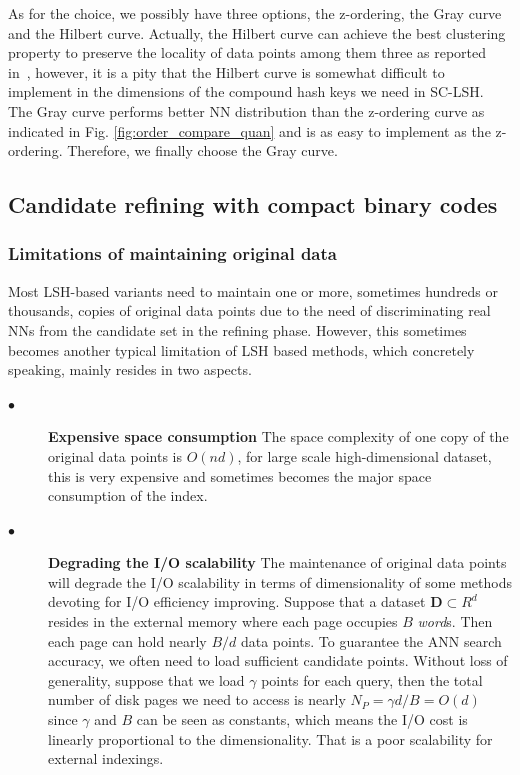 \documentclass[twocolumn]{svjour3}          %
\begin{document}
As for the choice, we possibly have three options, the z-ordering, the Gray curve and the Hilbert curve. Actually, the Hilbert curve can achieve the best clustering property to preserve the locality of data points among them three as reported in~\cite{Faloutsos1989Fractals}, however, it is a pity that the Hilbert curve is somewhat difficult to implement in the dimensions of the compound hash keys we need in SC-LSH. The Gray curve performs better NN distribution than the z-ordering curve as indicated in Fig. \ref{fig:order_compare_quan} and is as easy to implement as the z-ordering. Therefore, we finally choose the Gray curve. 


\subsection{Candidate refining with compact binary codes}
\label{ssec:introPQ}
\subsubsection{Limitations of maintaining original data}\label{sssec:originallimitations}
Most LSH-based variants need to maintain one or more, sometimes hundreds or thousands, copies of original data points due to the need of discriminating real NNs from the candidate set in the refining phase. However, this sometimes becomes another typical limitation of LSH based methods, which concretely speaking, mainly resides in two aspects.
\begin{description}
  \item[$\bullet$] \textbf{Expensive space consumption} The space complexity of one copy of the original data points is $O(nd)$, for large scale high-dimensional dataset, this is very expensive and sometimes becomes the major space consumption of the index.
  \item[$\bullet$] %
    \textbf{Degrading the I/O scalability} The maintenance of original data points will degrade the I/O scalability in terms of dimensionality of some methods devoting for I/O efficiency improving. Suppose that a dataset $\textbf{D}\subset R^d$ resides in the external memory where each page occupies $B$ \emph{word}s. Then each page can hold nearly $B/d$ data points. To guarantee the ANN search accuracy, we often need to load sufficient candidate points. Without loss of generality, suppose that we load $\gamma$ points for each query, then the total number of disk pages we need to access is nearly $N_P=\gamma d/B=O(d)$ since $\gamma$ and $B$ can be seen as constants, which means the I/O cost is linearly proportional to the dimensionality. That is a poor scalability for external indexings.
\end{description}
\end{document}
